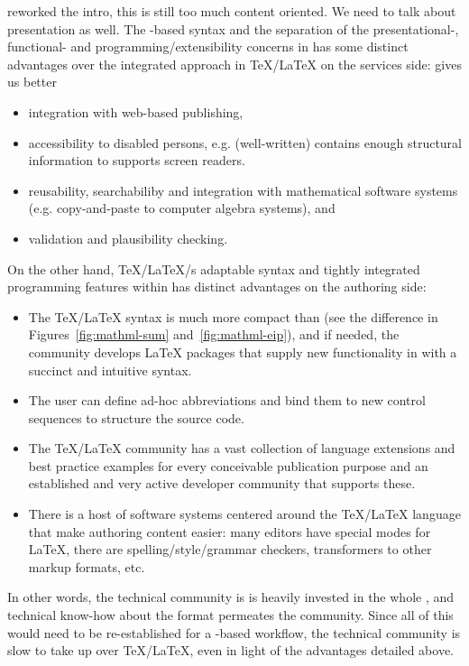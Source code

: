 \begin{newpart}{reworked the intro, this is still too much content oriented. We need to
    talk about presentation as well. }
The {\xml}-based syntax and the separation of the presentational-, functional- and
programming/extensibility concerns in {\mathml} has some distinct advantages over the
integrated approach in {\TeX/\LaTeX} on the services side: {\mathml} gives us better
\begin{itemize}
\item integration with web-based publishing,
\item accessibility to disabled persons, e.g. (well-written) {\mathml} contains enough
  structural information to supports screen readers.
\item reusability, searchabiliby and integration with mathematical software systems
  (e.g. copy-and-paste to computer algebra systems), and
\item validation and plausibility checking.
\end{itemize}
 
On the other hand, {\TeX/\LaTeX}/s adaptable syntax and tightly integrated programming
features within has distinct advantages on the authoring side:
 
\begin{itemize}
\item The {\TeX/\LaTeX} syntax is much more compact than {\mathml} (see the difference in
  Figures~\ref{fig:mathml-sum} and~\ref{fig:mathml-eip}), and if needed, the community
  develops {\LaTeX} packages that supply new functionality in with a succinct and intuitive
  syntax.
\item The user can define ad-hoc abbreviations and bind them to new control sequences to
  structure the source code.
\item The {\TeX/\LaTeX} community has a vast collection of language extensions and best
  practice examples for every conceivable publication purpose and an established and very
  active developer community that supports these.
\item There is a host of software systems centered around the {\TeX/\LaTeX} language that
  make authoring content easier: many editors have special modes for {\LaTeX}, there are
  spelling/style/grammar checkers, transformers to other markup formats, etc.
\end{itemize}
 
In other words, the technical community is is heavily invested in the whole
{}, and technical know-how about the format permeates the
community. Since all of this would need to be re-established for a {\mathml}-based
workflow, the technical community is slow to take up {\mathml} over {\TeX/\LaTeX}, even in
light of the advantages detailed above.
 

\end{newpart}
